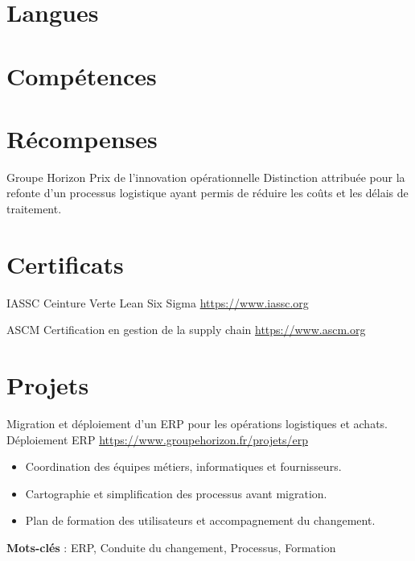 \documentclass[a4paper, serif, 10pt]{moderncv}
\begin{document}
\section{Langues}

\section{Compétences}

\section{Récompenses}

        {Groupe Horizon}
        {Prix de l'innovation opérationnelle}
        {}
        {}
        {Distinction attribuée pour la refonte d'un processus logistique ayant permis de réduire les coûts et les délais de traitement.}
\section{Certificats}

        {IASSC}
        {Ceinture Verte Lean Six Sigma}
        {\url{https://www.iassc.org}}
        {}
        {}

        {ASCM}
        {Certification en gestion de la supply chain}
        {\url{https://www.ascm.org}}
        {}
        {}
\section{Projets}

        {Migration et déploiement d'un ERP pour les opérations logistiques et achats.}
        {Déploiement ERP}
        {\url{https://www.groupehorizon.fr/projets/erp}}
        {}
        {\begin{itemize}
\item Coordination des équipes métiers, informatiques et fournisseurs.
\item Cartographie et simplification des processus avant migration.
\item Plan de formation des utilisateurs et accompagnement du changement.
\end{itemize}
\textbf{Mots-clés} : ERP, Conduite du changement, Processus, Formation}
\end{document}
